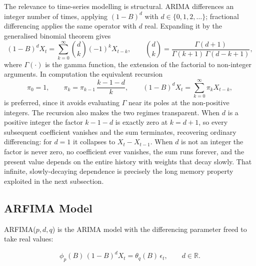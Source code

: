 \documentclass[12pt,a4paper]{article}
\begin{document}
The relevance to time-series modelling is structural. ARIMA differences an
integer number of times, applying $(1-B)^d$ with $d \in \{0,1,2,\dots\}$;
fractional differencing applies the same operator with $d$ real. Expanding it
by the generalised binomial theorem gives
\begin{equation}
(1-B)^{d} X_t = \sum_{k=0}^{\infty}\binom{d}{k}(-1)^{k} X_{t-k},
\qquad
\binom{d}{k} = \frac{\Gamma(d+1)}{\Gamma(k+1)\,\Gamma(d-k+1)},
\end{equation}
where $\Gamma(\cdot)$ is the gamma function, the extension of the factorial to
non-integer arguments. In computation the equivalent recursion
\begin{equation}
\pi_0 = 1, \qquad
\pi_k = \pi_{k-1}\,\frac{k-1-d}{k},
\qquad
(1-B)^{d}X_t = \sum_{k=0}^{\infty}\pi_k X_{t-k},
\end{equation}
is preferred, since it avoids evaluating $\Gamma$ near its poles at the
non-positive integers. The recursion also makes the two regimes transparent.
When $d$ is a positive integer the factor $k-1-d$ is exactly zero at $k=d+1$,
so every subsequent coefficient vanishes and the sum terminates, recovering
ordinary differencing: for $d=1$ it collapses to $X_t - X_{t-1}$. When $d$ is
not an integer the factor is never zero, no coefficient ever vanishes, the sum
runs forever, and the present value depends on the entire history with weights
that decay slowly.
That infinite, slowly-decaying dependence is precisely the long memory
property exploited in the next subsection.

\subsection{ARFIMA Model}

ARFIMA($p,d,q$) is the ARIMA model with the differencing parameter freed to
take real values:

\begin{equation}
\phi_p(B)\,(1-B)^{d} X_t = \theta_q(B)\,\epsilon_t,
\qquad d \in \mathbb{R}.
\end{equation}
\end{document}
